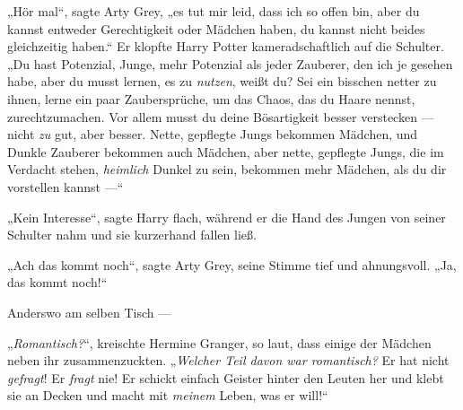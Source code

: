„Hör mal“, sagte Arty Grey, „es tut mir leid, dass ich so offen bin, aber du kannst entweder Gerechtigkeit oder Mädchen haben, du kannst nicht beides gleichzeitig haben.“ Er klopfte Harry Potter kameradschaftlich auf die Schulter.
„Du hast Potenzial, Junge, mehr Potenzial als jeder Zauberer, den ich je gesehen habe, aber du musst lernen, es zu \emph{nutzen}, weißt du? Sei ein bisschen netter zu ihnen, lerne ein paar Zaubersprüche, um das Chaos, das du Haare nennst, zurechtzumachen. Vor allem musst du deine Bösartigkeit besser verstecken — nicht \emph{zu} gut, aber besser. Nette, gepflegte Jungs bekommen Mädchen, und Dunkle Zauberer bekommen auch Mädchen, aber nette, gepflegte Jungs, die im Verdacht stehen, \emph{heimlich} Dunkel zu sein, bekommen mehr Mädchen, als du dir vorstellen kannst —“

„Kein Interesse“, sagte Harry flach, während er die Hand des Jungen von seiner Schulter nahm und sie kurzerhand fallen ließ.

„Ach das kommt noch“, sagte Arty Grey, seine Stimme tief und ahnungsvoll.
„Ja, das kommt noch!“

Anderswo am selben Tisch —

„\emph{Romantisch?}“, kreischte Hermine Granger, so laut, dass einige der Mädchen neben ihr zusammenzuckten.
„\emph{Welcher Teil davon war romantisch?} Er hat nicht \emph{gefragt}! Er \emph{fragt} nie! Er schickt einfach Geister hinter den Leuten her und klebt sie an Decken und macht mit \emph{meinem} Leben, was er will!“

